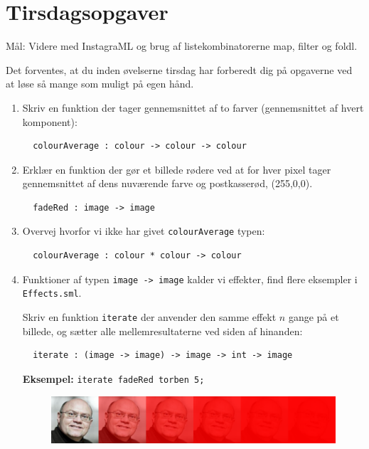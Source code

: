 \documentclass[a4paper,12pt]{article}
\begin{document}
\newpage
\section{Tirsdagsopgaver}
\label{sec:tirsdagsopgaver}
Mål: Videre med InstagraML og brug af listekombinatorerne map, filter og foldl.

Det forventes, at du inden øvelserne tirsdag har forberedt dig på
opgaverne ved at løse så mange som muligt på egen hånd.
\begin{enumerate}[{3}T1]
\item Skriv en funktion der tager gennemsnittet af to farver
  (gennemsnittet af hvert komponent):
\begin{lstlisting}
  colourAverage : colour -> colour -> colour
\end{lstlisting}

\item Erklær en funktion der gør et billede rødere ved at for hver
  pixel tager gennemsnittet af dens nuværende farve og postkasserød,
  (255,0,0).
\begin{lstlisting}
  fadeRed : image -> image
\end{lstlisting}

\item
Overvej hvorfor vi ikke har givet \verb|colourAverage| typen:
\begin{lstlisting}
  colourAverage : colour * colour -> colour
\end{lstlisting}

\item Funktioner af typen \verb|image -> image| kalder vi effekter,
  find flere eksempler i \verb|Effects.sml|.

  Skriv en funktion \verb|iterate| der anvender den samme effekt $n$
  gange på et billede, og sætter alle mellemresultaterne ved siden af
  hinanden:
\begin{lstlisting}
  iterate : (image -> image) -> image -> int -> image
\end{lstlisting}

\textbf{Eksempel:} \lstinline{iterate fadeRed torben 5;}
\begin{figure}[h!]
  \centering
  \includegraphics[width=15cm]{uge3_fadeTorben.png}
\end{figure}


\end{enumerate}
\end{document}
